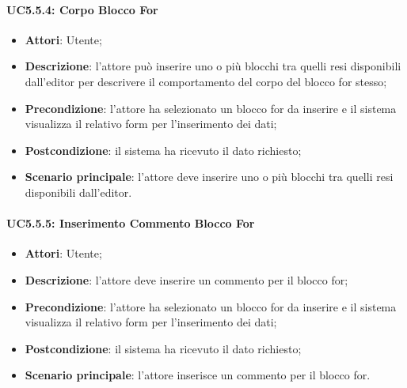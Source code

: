 \begin{itemize}
\begin{itemize}
\begin{itemize}
\begin{itemize}
\paragraph{UC5.5.4: Corpo Blocco For}
\label{UC5.5.4}
\begin{itemize}
	\item \textbf{Attori}: Utente;
	\item \textbf{Descrizione}: l'attore può inserire uno o più blocchi tra quelli resi disponibili dall'editor per descrivere il comportamento del corpo del blocco for stesso;
	\item \textbf{Precondizione}: l'attore ha selezionato un blocco for da inserire e il sistema visualizza il relativo form per l'inserimento dei dati;
	\item \textbf{Postcondizione}: il sistema ha ricevuto il dato richiesto;
	\item \textbf{Scenario principale}: l'attore deve inserire uno o più blocchi tra quelli resi disponibili dall'editor.
\end{itemize}

\paragraph{UC5.5.5: Inserimento Commento Blocco For}
\label{UC5.5.5}
\begin{itemize}
	\item \textbf{Attori}: Utente;
	\item \textbf{Descrizione}: l'attore deve inserire un commento per il blocco for;
	\item \textbf{Precondizione}: l'attore ha selezionato un blocco for da inserire e il sistema visualizza il relativo form per l'inserimento dei dati;
	\item \textbf{Postcondizione}: il sistema ha ricevuto il dato richiesto;
	\item \textbf{Scenario principale}: l'attore inserisce un commento per il blocco for.
\end{itemize}


\end{itemize}
\end{itemize}
\end{itemize}
\end{itemize}
